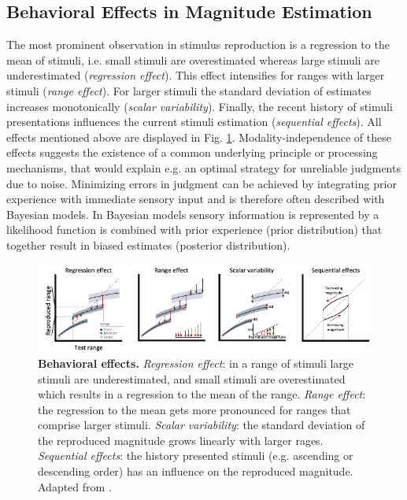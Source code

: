 \documentclass[10pt]{article}
\begin{document}
\subsection{Behavioral Effects in Magnitude Estimation}
The most prominent observation in stimulus reproduction is a regression to the mean of stimuli, i.e. small stimuli are overestimated whereas large stimuli are underestimated (\textit{regression effect}). 
This effect intensifies for ranges with larger stimuli (\textit{range effect}).
For larger stimuli the standard deviation of estimates increases monotonically (\textit{scalar variability}). 
Finally, the recent history of stimuli presentations influences the current stimuli estimation (\textit{sequential effects}).
All effects mentioned above are displayed in Fig. \ref{fig:behavioraleffects}. 
Modality-independence of these effects suggests the existence of a common underlying principle or processing mechanisms, that would explain e.g. an optimal strategy for unreliable judgments due to noise.
Minimizing errors in judgment can be achieved by integrating prior experience with immediate sensory input and is therefore often described with Bayesian models.
In Bayesian models sensory information is represented by a likelihood function is combined with prior experience (prior distribution) that together result in biased estimates (posterior distribution).

\begin{figure}[ht]
	\centering
	\includegraphics[width=\textwidth]{figures/behavioural_effects_petzschner.pdf}
	\caption{\textbf{Behavioral effects.} 
	\textit{Regression effect}: in a range of stimuli large stimuli are underestimated, and small stimuli are overestimated which results in a regression to the mean of the range.
	\textit{Range effect}: the regression to the mean gets more pronounced for ranges that comprise larger stimuli. 
	\textit{Scalar variability}: the standard deviation of the reproduced magnitude grows linearly with larger rages. 
	\textit{Sequential effects}: the history presented stimuli (e.g. ascending or descending order) has an influence on the reproduced magnitude. 
	Adapted from \cite{Petzschner2015}.}
	\label{fig:behavioraleffects}
\end{figure}
\end{document}
